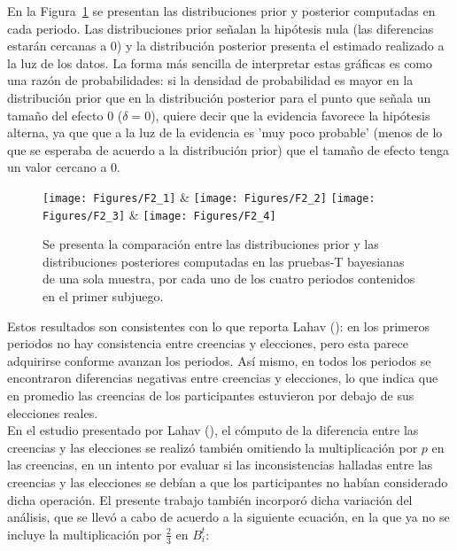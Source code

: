 En la Figura~\ref{fig:DN_S1} se presentan las distribuciones prior y posterior computadas en cada periodo. Las distribuciones prior señalan la hipótesis nula (las diferencias estarán cercanas a 0) y la distribución posterior presenta el estimado realizado a la luz de los datos. La forma más sencilla de interpretar estas gráficas es como una razón de probabilidades: si la densidad de probabilidad es mayor en la distribución prior que en la distribución posterior para el punto que señala un tamaño del efecto 0 ($\delta = 0$), quiere decir que la evidencia favorece la hipótesis alterna, ya que que a la luz de la evidencia es 'muy poco probable' (menos de lo que se esperaba de acuerdo a la distribución prior) que el tamaño de efecto tenga un valor cercano a 0.\\
  
\begin{figure}[hp]
\centering
\texttt{[image: Figures/F2\_1]} & \texttt{[image: Figures/F2\_2]} 
\texttt{[image: Figures/F2\_3]} & \texttt{[image: Figures/F2\_4]} 
\decoRule
\caption[Evaluación de las Diferencias Normalizadas entre creencias y elecciones en el Subjuegoo 1 (Factor de Bayes)]{Se presenta la comparación entre las distribuciones prior y las distribuciones posteriores computadas en las pruebas-T bayesianas de una sola muestra, por cada uno de los cuatro periodos contenidos en el primer subjuego.}
\label{fig:DN_S1}
\end{figure}

Estos resultados son consistentes con lo que reporta Lahav (\citeyear{Lahav}): en los primeros periodos no hay consistencia entre creencias y elecciones, pero esta parece adquirirse conforme avanzan los periodos. Así mismo, en todos los periodos se encontraron diferencias negativas entre creencias y elecciones, lo que indica que en promedio las creencias de los participantes estuvieron por debajo de sus elecciones reales.\\

En el estudio presentado por Lahav (\citeyear{Lahav}), el cómputo de la diferencia entre las creencias y las elecciones se realizó también omitiendo la multiplicación por $p$ en las creencias, en un intento por evaluar si las inconsistencias halladas entre las creencias y las elecciones se debían a que los participantes no habían considerado dicha operación. El presente trabajo también incorporó dicha variación del análisis, que se llevó a cabo de acuerdo a la siguiente ecuación, en la que ya no se incluye la multiplicación por $\frac{2}{3}$ en $B_i^t$:\\


